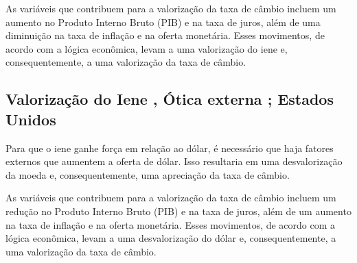 \documentclass[a4paper,12pt]{article}[abntex2]
\begin{document}
As variáveis que contribuem para a valorização da taxa de câmbio incluem um aumento no Produto Interno Bruto (PIB) e na taxa de juros, além de uma diminuição na taxa de inflação e na oferta monetária. Esses movimentos, de acordo com a lógica econômica, levam a uma valorização do iene e, consequentemente, a uma valorização da taxa de câmbio.

\subsection{\textbf{Valorização do Iene , Ótica externa ; Estados Unidos}}
Para que o iene ganhe força em relação ao dólar, é necessário que haja fatores externos que aumentem a oferta de dólar. Isso resultaria em uma desvalorização da moeda e, consequentemente, uma apreciação da taxa de câmbio.

As variáveis que contribuem para a valorização da taxa de câmbio incluem um redução no Produto Interno Bruto (PIB) e na taxa de juros, além de um aumento na taxa de inflação e na oferta monetária. Esses movimentos, de acordo com a lógica econômica, levam a uma desvalorização do dólar e, consequentemente, a uma valorização da taxa de câmbio.
\end{document}

